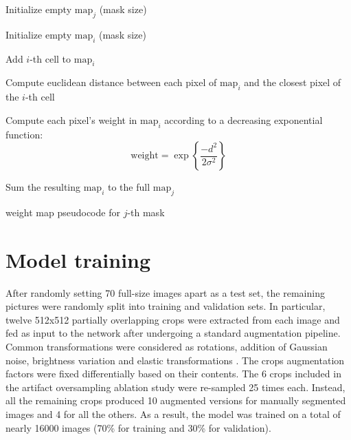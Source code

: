 \begin{algorithm}%
\DontPrintSemicolon
     Initialize empty $\text{map}_j$ (mask size)
    {
         Initialize empty $\text{map}_i$  (mask size) 
        
         Add $i$-th cell to $\text{map}_i$
        
         Compute euclidean distance between each pixel of $\text{map}_i$ and the closest pixel of the $i$-th cell \label{step:distance}
        
         Compute each pixel's weight in $\text{map}_i$ according to a decreasing exponential function:
        \begin{equation}
        \text{weight} = \exp\left\{\dfrac{-d^{2}}{2\sigma^{2}}\right\}
        \label{eq:weight_formula}
        \end{equation}
        
        
    Sum the resulting $\text{map}_i$ to the full $\text{map}_j$
}
\caption{weight map pseudocode for $j$-th mask}
\label{algo:pseudocode_weightmap}
\end{algorithm}

\section{Model training}
\label{sec:model_training}
After randomly setting 70 full-size images apart as a test set, the remaining pictures were randomly split into training and validation sets. 
In particular, twelve 512x512 partially overlapping crops were extracted from each image and fed as input to the network after undergoing a standard augmentation pipeline. Common transformations were considered as rotations, addition of Gaussian noise, brightness variation and elastic transformations \cite{elastic_tranformation}. 
The crops augmentation factors were fixed differentially based on their contents. 
The 6 crops included in the artifact oversampling ablation study were re-sampled 25 times each.
Instead, all the remaining crops produced 10 augmented versions for manually segmented images and 4 for all the others.
As a result, the model was trained on a total of nearly 16000 images (70\% for training and 30\% for validation).

